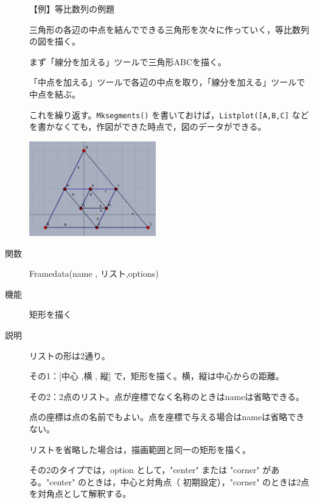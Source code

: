 \documentclass[papersize,a4paper,12pt,uplatex]{jsarticle}
\begin{document}
\begin{description}
\vspace{\baselineskip}
【例】等比数列の例題

三角形の各辺の中点を結んでできる三角形を次々に作っていく，等比数列の図を描く。

まず「線分を加える」ツールで三角形ABCを描く。

「中点を加える」ツールで各辺の中点を取り，「線分を加える」ツールで中点を結ぶ。

これを繰り返す。\verb|Mksegments()| を書いておけば，\verb|Listplot([A,B,C]| などを書かなくても，作図ができた時点で，図のデータができる。

\includegraphics[bb=0.00 0.00 438.02 327.02,width=5.5cm]{Fig/gpro01.pdf} 

\vspace{\baselineskip}
\hypertarget{framedata}{}
\item[関数]Framedata(name , リスト,options)
\item[機能]矩形を描く
\item[説明]リストの形は2通り。

その1：[中心 ,横 , 縦] で，矩形を描く。横，縦は中心からの距離。

その2：2点のリスト。点が座標でなく名称のときはnameは省略できる。

点の座標は点の名前でもよい。点を座標で与える場合はnameは省略できない。

リストを省略した場合は，描画範囲と同一の矩形を描く。

その2のタイプでは，option として，"center" または "corner" がある。"center" のときは，中心と対角点（ 初期設定），"corner" のときは2点を対角点として解釈する。 


\end{description}
\end{document}
